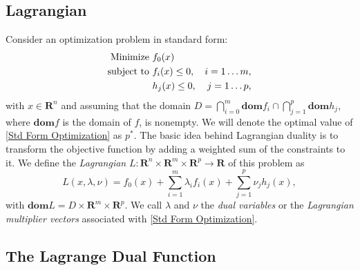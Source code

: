 	\subsection{Lagrangian}

	Consider an optimization problem in standard form:
	\begin{equation} \label{Std Form Optimization}
		\begin{aligned}
			\textnormal{Minimize } & f_0 (x) \\
			\textnormal{subject to } & f_i (x) \leq 0, & i = 1 \dots m,\\
			& h_j (x) \leq 0, & j = 1 \dots p,
		\end{aligned}
	\end{equation}	
	with $x \in \mathbf{R}^n$ and assuming that the domain $D = \bigcap_{i = 0}^m \mathbf{dom} f_i \cap \bigcap_{j = 1}^p \mathbf{dom} h_j$, where $\mathbf{dom}f$ is the domain of $f$, is nonempty. We will denote the optimal value of \eqref{Std Form Optimization} as $p^*$. The basic idea behind Lagrangian duality is to transform the objective function by adding a weighted sum of the constraints to it. We define the \emph{Lagrangian} $L: \mathbf{R}^n \times \mathbf{R}^m \times \mathbf{R}^p \rightarrow \mathbf{R}$ of this problem as 
	\begin{equation} \label{Lagrangian}
		L(x, \lambda, \nu) = f_0 (x) + \sum_{i = 1}^{m} \lambda_i f_i (x) + \sum_{j = 1}^{p} \nu_j h_j (x),
	\end{equation}
	with $\mathbf{dom} L = D \times \mathbf{R}^m \times \mathbf{R}^p$. We call $\lambda$ and $\nu$ the \emph{dual variables} or the \emph{Lagrangian multiplier vectors} associated with \eqref{Std Form Optimization}. 
	
	\subsection{The Lagrange Dual Function}

